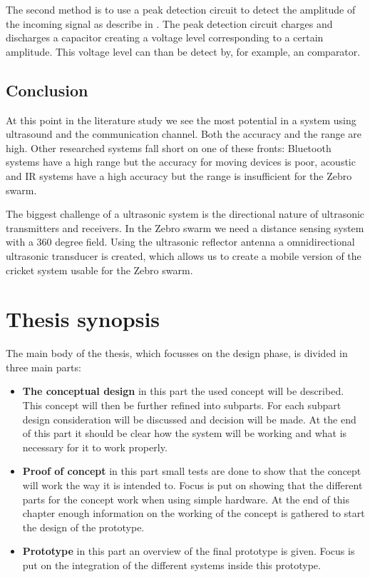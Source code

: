 The second method is to use a peak detection circuit to detect the amplitude of the incoming signal as describe in \cite{Bhagat2015}.
The peak detection circuit charges and discharges a capacitor creating a voltage level corresponding to a certain amplitude.
This voltage level can than be detect by, for example, an comparator.

\subsection*{Conclusion}

At this point in the literature study we see the most potential in a system using ultrasound and the communication channel. Both the accuracy and the range are high. Other researched systems fall short on one of these fronts: Bluetooth systems have a high range but the accuracy for moving devices is poor, acoustic and IR systems have a high accuracy but the range is insufficient for the Zebro swarm.

The biggest challenge of a ultrasonic system is the directional nature of ultrasonic transmitters and receivers. In the Zebro swarm we need a distance sensing system with a 360 degree field. Using the ultrasonic reflector antenna \cite{Claycomb1992} a omnidirectional ultrasonic transducer is created, which allows us to create a mobile version of the cricket system \cite{Priyantha2000,Priyantha2005,Balakrishnan2003,Smith2005} usable for the Zebro swarm.


\section{Thesis synopsis}

The main body of the thesis, which focusses on the design phase, is divided in three main parts:

\begin{itemize}
  \item
  \textbf{The conceptual design} in this part the used concept will be described.
  This concept will then be further refined into subparts.
  For each subpart design consideration will be discussed and decision will be made.
  At the end of this part it should be clear how the system will be working and what is necessary for it to work properly.
  \item
  \textbf{Proof of concept} in this part small tests are done to show that the concept will work the way it is intended to.
  Focus is put on showing that the different parts for the concept work when using simple hardware.
  At the end of this chapter enough information on the working of the concept is gathered to start the design of the prototype.
  \item
  \textbf{Prototype} in this part an overview of the final prototype is given.
  Focus is put on the integration of the different systems inside this prototype.
  \end{itemize}

